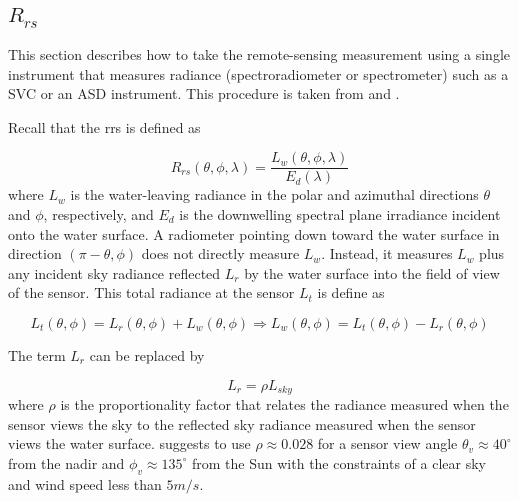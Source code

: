 \begin{appendices}
\section{\texorpdfstring{$R_{rs}$}{Rrs}}


This section describes how to take the remote-sensing measurement using a single instrument that measures radiance (spectroradiometer or spectrometer) such as a SVC \cite{SVCHR1024i} or an ASD \cite{ASDManual2012} instrument. This procedure is taken from \cite{Mobley:1999} and \cite{Mueller1995}. 

Recall that the \gls{rrs} is defined as

\begin{equation}\label{eq:Rrs}
	R_{rs}(\theta,\phi,\lambda)=\frac{L_w(\theta,\phi,\lambda)}{E_d(\lambda)}
\end{equation}
where $L_w$ is the water-leaving radiance in the polar and azimuthal directions $\theta$ and $\phi$, respectively, and $E_d$ is the downwelling spectral plane irradiance incident onto the water surface. A radiometer pointing down toward the water surface in direction $(\pi-\theta,\phi)$ does not directly measure $L_w$. Instead, it measures $L_w$  plus any incident sky radiance reflected $L_r$ by the water surface into the field of view of the sensor. This total radiance at the sensor $L_t$ is define as

\begin{equation}\label{eq:Lt}
	L_t(\theta,\phi) = L_r(\theta,\phi)+L_w(\theta,\phi)\Rightarrow L_w(\theta,\phi)=L_t(\theta,\phi) - L_r(\theta,\phi)
\end{equation}

The term $L_r$ can be replaced by

\begin{equation}\label{eq:Lsky}
	L_r = \rho L_{sky}
\end{equation}
where $\rho$ is the proportionality factor that relates the radiance measured when the sensor views the sky to the reflected sky radiance measured when the sensor views the water surface. \cite{Mobley:1999} suggests to use $\rho \approx 0.028$ for a sensor view angle $\theta_v \approx 40^\circ$ from the nadir and  $\phi_v \approx 135^\circ$ from the Sun with the constraints of a clear sky and wind speed less than $5m/s$.


\end{appendices}
